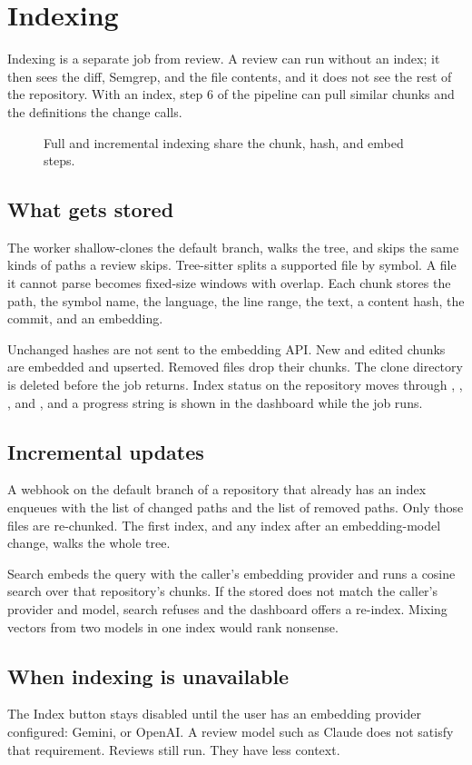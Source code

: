 \chapter{Indexing}
\label{chap:index}

Indexing is a separate job from review. A review can run without an index; it then sees the diff, Semgrep, and the file contents, and it does not see the rest of the repository. With an index, step 6 of the pipeline can pull similar chunks and the definitions the change calls.

\begin{figure}[H]
  \centering
  \resizebox{\linewidth}{!}{}
  \caption{Full and incremental indexing share the chunk, hash, and embed steps.}
  \label{fig:index-flow}
\end{figure}

\section{What gets stored}

The worker shallow-clones the default branch, walks the tree, and skips the same kinds of paths a review skips. Tree-sitter splits a supported file by symbol. A file it cannot parse becomes fixed-size windows with overlap. Each chunk stores the path, the symbol name, the language, the line range, the text, a content hash, the commit, and an embedding.

Unchanged hashes are not sent to the embedding API. New and edited chunks are embedded and upserted. Removed files drop their chunks. The clone directory is deleted before the job returns. Index status on the repository moves through , , , and , and a progress string is shown in the dashboard while the job runs.

\section{Incremental updates}

A  webhook on the default branch of a repository that already has an index enqueues  with the list of changed paths and the list of removed paths. Only those files are re-chunked. The first index, and any index after an embedding-model change, walks the whole tree.

Search embeds the query with the caller's embedding provider and runs a cosine search over that repository's chunks. If the stored  does not match the caller's provider and model, search refuses and the dashboard offers a re-index. Mixing vectors from two models in one index would rank nonsense.

\section{When indexing is unavailable}

The Index button stays disabled until the user has an embedding provider configured: Gemini, or OpenAI. A review model such as Claude does not satisfy that requirement. Reviews still run. They have less context.
